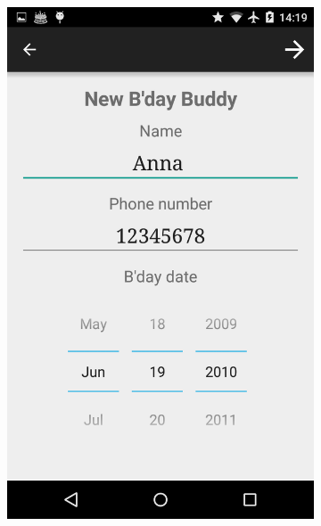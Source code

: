\begin{figure}[ht]
\begin{subfigure}[b]{0.35\textwidth}
        \includegraphics[width=\textwidth]{./img/nexus4/2.png}
        \label{fig:res_pers}
    \end{subfigure}
    \begin{subfigure}[b]{0.35\textwidth}

\end{subfigure}
\end{figure}
